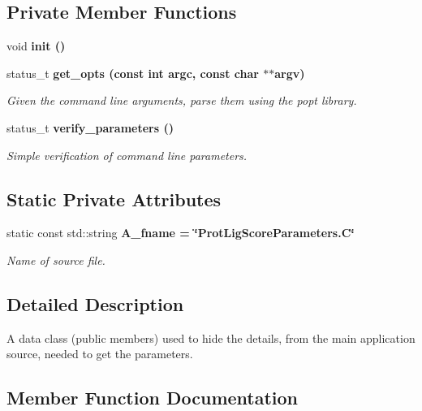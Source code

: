 \subsection*{Private Member Functions}
\begin{CompactItemize}
\item 
void \bf{init} ()
\item 
status\_\-t \bf{get\_\-opts} (const int argc, const char $\ast$$\ast$argv)
\begin{CompactList}\small\item\em Given the command line arguments, parse them using the popt library. \item\end{CompactList}\item 
status\_\-t \bf{verify\_\-parameters} ()
\begin{CompactList}\small\item\em Simple verification of command line parameters. \item\end{CompactList}\end{CompactItemize}
\subsection*{Static Private Attributes}
\begin{CompactItemize}
\item 
static const std::string \bf{A\_\-fname} = \char`\"{}Prot\-Lig\-Score\-Parameters.C\char`\"{}\label{classASCbase_1_1ProtLigScoreParameters_fa12c92a4a3e4952fd98edace796988a}

\begin{CompactList}\small\item\em Name of source file. \item\end{CompactList}\end{CompactItemize}


\subsection{Detailed Description}
A data class (public members) used to hide the details, from the main application source, needed to get the parameters. 



\subsection{Member Function Documentation}
